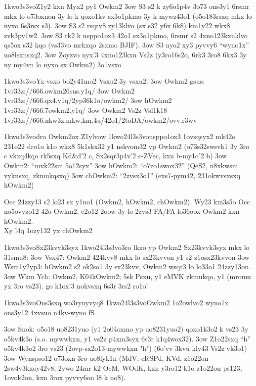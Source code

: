  \p1kwo3s3vo{Z1y2 kxn Myx2 py1 Owkm2}
  \s3ow   S3 s2 k zy6o1p4v 3o73 ons3y1 6rsmr
    mkx lo o73oxnon 3y lo k qoxo1kv sx3o1pkmo 3y k mywz43o1 (o5o183rsxq mkx lo nyxo 6s3rsx s3).
  \s3ow S3 s2 rsqrv8 zy13klvo (sx s32 y6x 6k8) km1y22 wkx8 zvk3py1w2.
  \s3ow  S3 rk2 k nsppo1ox3 42o1 sx3o1pkmo,
    6rsmr s2 4xno123kxnklvo qs5ox s32 kqo (vs33vo mrkxqo 2sxmo BJIF).
  \s3ow S3 nyo2 xy3 pyvvy6 ``wyno1x'' uo8lsxnsxq2.
  \s3ow Zoyzvo nyx'3 4xno123kxn Vs2z (y3ro16s2o, 6rk3 3ro8 6kx3 3y ny
    my4vn lo nyxo sx Owkm2)
  \mox3o1vsxo{}

  \p1kwo3s3vo{Yx-vsxo bo2y41mo2}
  Vsxu2 3y vsxu2:
  \s3ow Owkm2 gsus: \41v{r33z://666.owkm26sus.y1q/}
  \s3ow Owkm2 \41v{r33z://666.qx4.y1q/2yp36k1o/owkm2/}
  \s3ow hOwkm2 \41v{r33z://666.7owkm2.y1q/}
  \s3ow Owkm2 Vs2z Vsl1k18 \41v{r33z://666.nkw3z.mkw.km.4u/42o1/2toDA/owkm2/ovv.r3wv}

  \p1kwo3s3vo{dro Owkm2ox Z1ylvow}
  \p1kwo24l3s3vo{nsppo1ox3 1ovsqsyx2 mk42o 231o22}
  dro1o k1o wkx8 5k1skx32 y1 nskvom32 yp Owkm2 (\3o73s3{2swsvk1 3y 3ro
    c vkxq4kqo rk5sxq Kd\&d'2 c, Sx2sqr3p4v'2 c-ZVec, kxn b-my1o'2 b})
  \s3ow Owkm2: ``mvk22sm 5o12syx''
  \s3ow hOwkm2: ``o7zo1swox32'' (QeS2, n8xkwsm vyknsxq, zkmukqsxq)
  \s3ow chOwkm2: ``2zvsx3o1'' (exs7-pym42, 231okwvsxsxq hOwkm2)
  
  Occ 24zzy13 s2 lo23 sx y1no1 (Owkm2, hOwkm2, chOwkm2).  Wy23 km3s5o
  Occ no5ovyzo12 42o Owkm2.  e2o12 2oow 3y lo 2zvs3 FA/FA lo36oox
  Owkm2 kxn hOwkm2.\\
  Xy l4q 1ozy132 yx chOwkm2 

  \p1kwo3s3vo{Sx23kvvk3syx}
  \p1kwo24l3s3vo{3ro lkxo yp Owkm2}
  Sx23kvvk3syx mkx lo 31smu8:
  \s3ow Vsx47: Owkm2 424kvv8 mkx lo sx23kvvon y1 s2 z1osx23kvvon
  \s3ow Wsm1y2yp3: hOwkm2 s2 ok2so1 3y sx23kvv, Owkm2 wsqr3 lo lo33o1
    24zzy13on.
  \s3ow Wkm Ych: Owkm2, K04kOwkm2; 5sk Psxu, y1 eMVK zkmukqo, y1
    (mromu yx 3ro vs23).
  go k1ox'3 nokvsxq 6s3r 3rs2 ro1o!

 \p1kwo3s3vo{Ons3sxq wo3rynyvyq8}
  \p1kwo24l3s3vo{Owkm2 1o2owlvo2 wyno1x ons3y12 4xvsuo n4kv-wyno fS}

  \s3ow Snok: o5o18 uo8231yuo (y1 2o04oxmo yp uo8231yuo2) qoxo1k3o2 k
    vs23 3y o5kv4k3o (s.o. mywwkxn, y1 vs2z p4xm3syx 6s3r k1q4wox32).
  \s3ow Z1o22sxq ``h'' o5kv4k3o2 3ro vs23 (2ovp-sx2o13-mywwkxn "h")  (6o'vv 3kvu kly43 Vs2z vk3o1)    
  \s3ow Wynspso12 o73oxn 3ro uo8lyk1n (MdV, cRSPd, KVd, z1o22on
    2sw4v3kxoy42v8, 2ywo 24mr k2 OcM, WOdK, kxn y3ro12 k1o z1o22on
    ps123, 1ovok2on, kxn 3rox pyvvy6on l8 k uo8).

